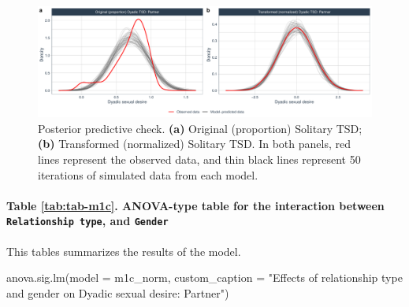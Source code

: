 \documentclass[
  bookmarksnumbered]{article}
\newenvironment{Shaded}{\begin{snugshade}}{\end{snugshade}}
\newcommand{\AttributeTok}[1]{\textcolor[rgb]{0.80,0.80,0.80}{#1}}
\newcommand{\FunctionTok}[1]{\textcolor[rgb]{0.94,0.94,0.56}{#1}}
\newcommand{\NormalTok}[1]{\textcolor[rgb]{0.80,0.80,0.80}{#1}}
\newcommand{\StringTok}[1]{\textcolor[rgb]{0.80,0.58,0.58}{#1}}
\begin{document}
\begin{figure}
\centering
\includegraphics{Sexual_Desire_Arousal_V2_files/figure-latex/ppc-m1c-1.pdf}
\caption{\label{fig:ppc-m1c}Posterior predictive check. \textbf{(a)} Original (proportion) Solitary TSD; \textbf{(b)} Transformed (normalized) Solitary TSD. In both panels, red lines represent the observed data, and thin black lines represent 50 iterations of simulated data from each model.}
\end{figure}

\paragraph{\texorpdfstring{Table \ref{tab:tab-m1c}. ANOVA-type table for the interaction between \texttt{Relationship\ type}, and \texttt{Gender}}{Table \ref{tab:tab-m1c}. ANOVA-type table for the interaction between Relationship type, and Gender}}\label{table-reftabtab-m1c.-anova-type-table-for-the-interaction-between-relationship-type-and-gender}

This tables summarizes the results of the model.

\begin{Shaded}
\begin{Highlighting}[]
\FunctionTok{anova.sig.lm}\NormalTok{(}\AttributeTok{model =}\NormalTok{ m1c\_norm, }\AttributeTok{custom\_caption =} \StringTok{"Effects of relationship type and gender on}
\StringTok{          Dyadic sexual desire: Partner"}\NormalTok{)}
\end{Highlighting}
\end{Shaded}
\end{document}
